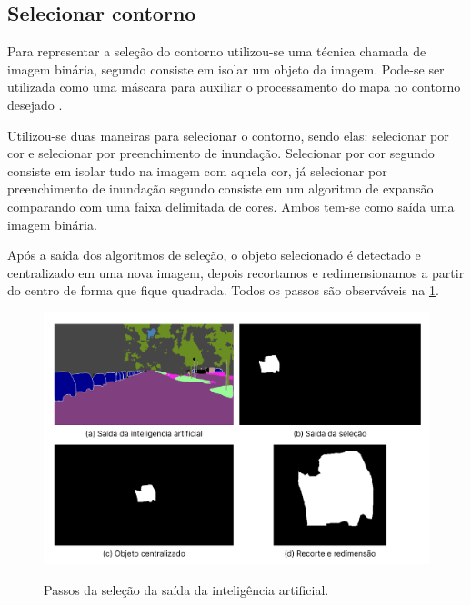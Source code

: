 \subsection{Selecionar contorno}

Para representar a seleção do contorno utilizou-se uma técnica chamada de imagem binária, segundo  consiste em isolar um objeto da imagem. Pode-se ser utilizada como uma máscara para auxiliar o processamento do  mapa no contorno desejado \cite{Aznag2020}.

Utilizou-se duas maneiras para selecionar o contorno, sendo elas: selecionar por cor e selecionar por preenchimento de inundação. Selecionar por cor segundo  consiste em isolar tudo na imagem com aquela cor, já selecionar por preenchimento de inundação segundo  consiste em um algoritmo de expansão comparando com uma faixa delimitada de cores. Ambos tem-se como saída uma imagem binária.


Após a saída dos algoritmos de seleção, o objeto selecionado é detectado e centralizado em uma nova imagem, depois recortamos e redimensionamos a partir do centro de forma que fique quadrada. Todos os passos são observáveis na \cref{fig:saidas_selecao}.

\begin{figure}[!ht]
	\centering
    \caption{Passos da seleção da saída da inteligência  artificial.}
	\includegraphics[width=1.0\textwidth]{figures/saidas_selecao.png}
	\label{fig:saidas_selecao}
\end{figure}

